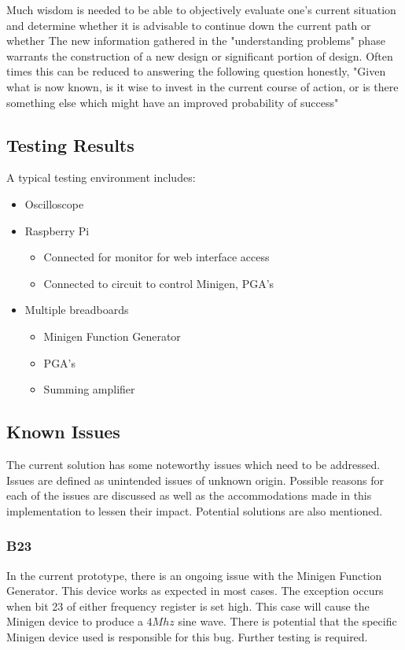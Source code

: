 \documentclass{article}	%
\begin{document}
\begin{multicols}{2}
Much wisdom is needed to be able to objectively 
evaluate one's current situation and determine 
whether it is advisable to
continue down the current path or whether
The new information gathered in the "understanding problems" phase
warrants the construction of a new design 
or significant portion of design.
Often times this can be reduced to answering the following question honestly,
"Given what is now known,
is it wise to invest in the current course of action, or
is there something else which might have an improved probability of success"


\subsection{Testing Results}

A typical testing environment includes:
\begin{itemize}
\item Oscilloscope
\item Raspberry Pi
  \begin{itemize}
  \item Connected for monitor for web interface access
  \item Connected to circuit to control Minigen, PGA's
  \end{itemize}
\item Multiple breadboards
  \begin{itemize}
  \item Minigen Function Generator
  \item PGA's
  \item Summing amplifier
  \end{itemize}
\end{itemize}


\subsection{Known Issues}
The current solution has some noteworthy issues
which need to be addressed.
Issues are defined as unintended issues of unknown origin.
Possible reasons for each of the issues are discussed as
well as the accommodations made in this implementation to lessen their impact.
Potential solutions are also mentioned.

\subsubsection{B23}
In the current prototype,
there is an ongoing issue with the Minigen Function Generator.
This device works as expected in most cases.
The exception occurs when bit 23 of either frequency register
is set high.
This case will cause the Minigen device to produce a $4Mhz$ sine wave.
There is potential that the specific Minigen device used 
is responsible for this bug.
Further testing is required.


\end{multicols}
\end{document}
